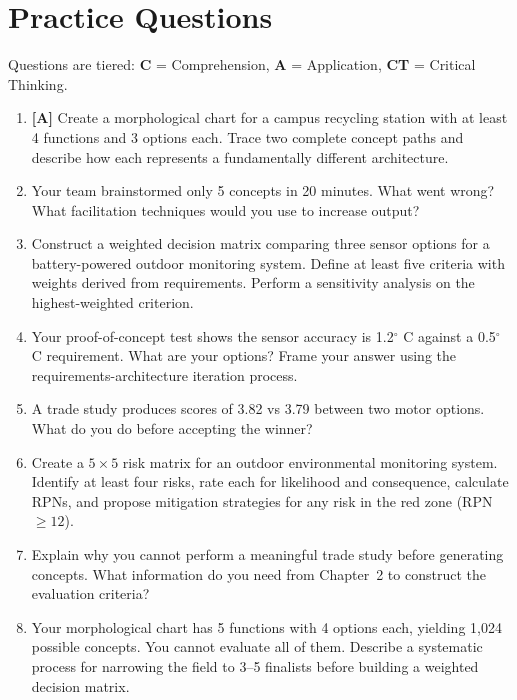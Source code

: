 \documentclass[11pt,letterpaper,twoside,openany]{book}
\begin{document}
\FloatBarrier
\section{Practice Questions}
Questions are tiered: \textbf{C} = Comprehension, \textbf{A} = Application, \textbf{CT} = Critical Thinking.
\begin{enumerate}[leftmargin=1.5em]
\item \textbf{[A]} Create a morphological chart for a campus recycling station with at least 4 functions and 3 options each. Trace two complete concept paths and describe how each represents a fundamentally different architecture.
\item Your team brainstormed only 5 concepts in 20 minutes. What went wrong? What facilitation techniques would you use to increase output?
\item Construct a weighted decision matrix comparing three sensor options for a battery-powered outdoor monitoring system. Define at least five criteria with weights derived from requirements. Perform a sensitivity analysis on the highest-weighted criterion.
\item Your proof-of-concept test shows the sensor accuracy is 1.2$^{\circ}$ C against a 0.5$^{\circ}$ C requirement. What are your options? Frame your answer using the requirements-architecture iteration process.
\item A trade study produces scores of 3.82 vs 3.79 between two motor options. What do you do before accepting the winner?
\item Create a $5 \times 5$ risk matrix for an outdoor environmental monitoring system. Identify at least four risks, rate each for likelihood and consequence, calculate RPNs, and propose mitigation strategies for any risk in the red zone (RPN $\geq 12$).
\item Explain why you cannot perform a meaningful trade study before generating concepts. What information do you need from Chapter~2 to construct the evaluation criteria?
\item Your morphological chart has 5 functions with 4 options each, yielding 1,024 possible concepts. You cannot evaluate all of them. Describe a systematic process for narrowing the field to 3--5 finalists before building a weighted decision matrix.
\end{enumerate}
\end{document}
